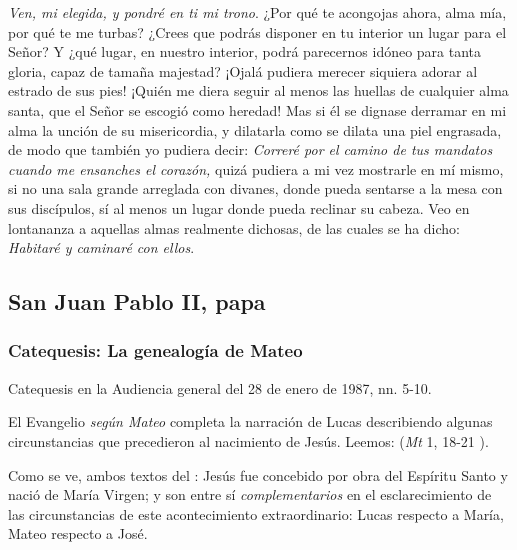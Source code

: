 \begin{body}
\begin{body}
\emph{Ven, mi elegida, y pondré en ti mi trono}. ¿Por qué te acongojas ahora, alma mía, por qué te me turbas? ¿Crees que podrás disponer en tu interior un lugar para el Señor? Y ¿qué lugar, en nuestro interior, podrá parecernos idóneo para tanta gloria, capaz de tamaña majestad? ¡Ojalá pudiera merecer siquiera adorar al estrado de sus pies! ¡Quién me diera seguir al menos las huellas de cualquier alma santa, que el Señor se escogió como heredad! Mas si él se dignase derramar en mi alma la unción de su misericordia, y dilatarla como se dilata una piel engrasada, de modo que también yo pudiera decir: \emph{Correré por el camino de tus mandatos cuando me ensanches el corazón,} quizá pudiera a mi vez mostrarle en mí mismo, si no una sala grande arreglada con divanes, donde pueda sentarse a la mesa con sus discípulos, sí al menos un lugar donde pueda reclinar su cabeza. Veo en lontananza a aquellas almas realmente dichosas, de las cuales se ha dicho: \emph{Habitaré y caminaré con ellos}.

\subsection{San Juan Pablo II, papa}

\subsubsection{Catequesis: La genealogía de Mateo}

Catequesis en la Audiencia general del 28 de enero de 1987, nn. 5-10.

El Evangelio \emph{según Mateo} completa la narración de Lucas describiendo algunas circunstancias que precedieron al nacimiento de Jesús. Leemos:  (\emph{Mt} 1, 18-21 ).

Como se ve, ambos textos del : Jesús fue concebido por obra del Espíritu Santo y nació de María Virgen; y son entre sí \emph{complementarios} en el esclarecimiento de las circunstancias de este acontecimiento extraordinario: Lucas respecto a María, Mateo respecto a José.


\end{body}
\end{body}
